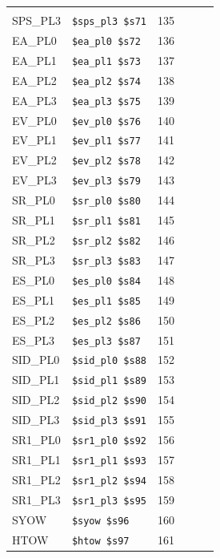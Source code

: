 \begin{table}
\begin{center}
{\begin{tabular}{|l|l|l||l|l|l|}
 & \verb|| &  \\
SPS_PL3 & \verb|$sps_pl3 $s71| & 135 &
 & \verb|| &  \\
EA_PL0 & \verb|$ea_pl0 $s72| & 136 &
 & \verb|| &  \\
EA_PL1 & \verb|$ea_pl1 $s73| & 137 &
 & \verb|| &  \\
EA_PL2 & \verb|$ea_pl2 $s74| & 138 &
 & \verb|| &  \\
EA_PL3 & \verb|$ea_pl3 $s75| & 139 &
 & \verb|| &  \\
EV_PL0 & \verb|$ev_pl0 $s76| & 140 &
 & \verb|| &  \\
EV_PL1 & \verb|$ev_pl1 $s77| & 141 &
 & \verb|| &  \\
EV_PL2 & \verb|$ev_pl2 $s78| & 142 &
 & \verb|| &  \\
EV_PL3 & \verb|$ev_pl3 $s79| & 143 &
 & \verb|| &  \\
SR_PL0 & \verb|$sr_pl0 $s80| & 144 &
 & \verb|| &  \\
SR_PL1 & \verb|$sr_pl1 $s81| & 145 &
 & \verb|| &  \\
SR_PL2 & \verb|$sr_pl2 $s82| & 146 &
 & \verb|| &  \\
SR_PL3 & \verb|$sr_pl3 $s83| & 147 &
 & \verb|| &  \\
ES_PL0 & \verb|$es_pl0 $s84| & 148 &
 & \verb|| &  \\
ES_PL1 & \verb|$es_pl1 $s85| & 149 &
 & \verb|| &  \\
ES_PL2 & \verb|$es_pl2 $s86| & 150 &
 & \verb|| &  \\
ES_PL3 & \verb|$es_pl3 $s87| & 151 &
 & \verb|| &  \\
SID_PL0 & \verb|$sid_pl0 $s88| & 152 &
 & \verb|| &  \\
SID_PL1 & \verb|$sid_pl1 $s89| & 153 &
 & \verb|| &  \\
SID_PL2 & \verb|$sid_pl2 $s90| & 154 &
 & \verb|| &  \\
SID_PL3 & \verb|$sid_pl3 $s91| & 155 &
 & \verb|| &  \\
SR1_PL0 & \verb|$sr1_pl0 $s92| & 156 &
 & \verb|| &  \\
SR1_PL1 & \verb|$sr1_pl1 $s93| & 157 &
 & \verb|| &  \\
SR1_PL2 & \verb|$sr1_pl2 $s94| & 158 &
 & \verb|| &  \\
SR1_PL3 & \verb|$sr1_pl3 $s95| & 159 &
 & \verb|| &  \\
SYOW & \verb|$syow $s96| & 160 &
 & \verb|| &  \\
HTOW & \verb|$htow $s97| & 161 &
 & \verb|| &  \\

\end{tabular}}
\end{center}
\end{table}
